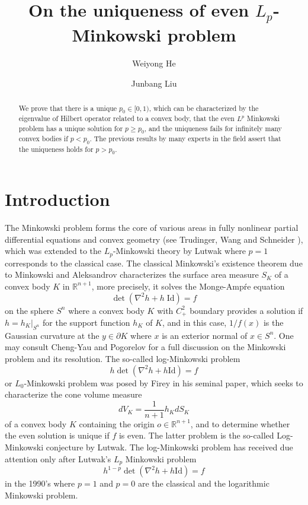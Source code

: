 \documentclass[reqno]{amsart}
\theoremstyle{remark}
\def\p{\partial}
\def\R{\mathbb{R}}
\theoremstyle{plain}
\begin{document}
\title{On the uniqueness of even $L_p$-Minkowski problem}

\author{Weiyong He}
\address{Department of Mathematics, University of Oregon, Eugene, OR 97403.}
\author{Junbang Liu}
\address{Department of Mathematics, Hong Kong University of Science and Technology, Clear Water Bay.}


\begin{abstract}We prove that there is a unique $p_0\in [0,1)$, which can be characterized by the eigenvalue of Hilbert operator related to a convex body, that the even $L^p$ Minkowski problem has a unique solution for $p\geq p_0$, and the uniqueness fails for infinitely many convex bodies if $p<p_0$. The previous results by many experts in the field assert that the uniqueness holds for $p>p_0$. \end{abstract}
\maketitle

\section{Introduction}

The Minkowski problem forms the core of various areas in fully nonlinear
partial differential equations and convex geometry (see Trudinger, Wang \cite{TW} and Schneider \cite{Schneider}), which was extended to the $L_p$-Minkowski theory
by Lutwak \cite{Lut93, Lut94, Lut95} where $p = 1$ corresponds to the classical case. The
classical Minkowski’s existence theorem due to Minkowski and Aleksandrov
characterizes the surface area measure $S_K$ of a convex body $K$ in $\R^{n+1}$, more
precisely, it solves the Monge-Amp\'re equation
\[
\det(\nabla^2 h+h\; \text{Id})=f
\]
on the sphere $S^{n}$ where a convex body $K$ with $C^2_+$
boundary provides
a solution if $h = h_K|_{S^{n}}$ for the support function $h_K$ of $K$, and in this
case, $1/f(x)$ is the Gaussian curvature at the $y \in \p K$ where $x$ is an exterior normal of $x\in S^{n}$. One may consult Cheng-Yau \cite{CY} and Pogorelov \cite{P} for a full discussion on the Minkowski problem and its resolution. 
The so-called log-Minkowski problem
\begin{equation}
    h \det(\nabla^2 h+ h\text{Id})=f
\end{equation}
or $L_0$-Minkowski problem was posed by Firey \cite{Firey66} in his seminal paper, which seeks to characterize the cone volume measure 
\[
dV_K=\frac{1}{n+1} h_KdS_K
\]
of a convex body $K$ containing the origin $o\in \R^{n+1}$, and to determine whether the even solution is unique if $f$ is even. The latter problem is the so-called Log-Minkowski conjecture by Lutwak. The log-Minkowski problem has received due attention only after Lutwak's $L_p$ Minkowski problem
\begin{equation}\label{p-minkowski-01}
    h^{1-p}\det (\nabla^2h+h\text{Id})=f
\end{equation}
in the 1990's where $p=1$ and $p=0$ are the classical and the logarithmic Minkowski problem. 
\end{document}
